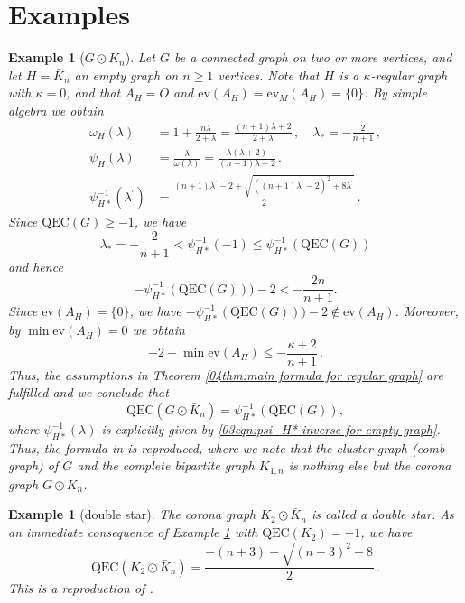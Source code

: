 \documentclass[12pt,a4paper]{article}
\newtheorem{example}[theorem]{Example}
\newcommand{\1}{{\bm 1}}
\numberwithin{equation}{section}
\begin{document}
\section{Examples}

\begin{example}[$G\odot \bar{K}_n$]
\label{05ex:H=empty graph}
\normalfont
Let $G$ be a connected graph on two or more vertices,
and let $H=\bar{K}_n$ an empty graph on $n\ge1$ vertices.
Note that $H$ is a $\kappa$-regular graph with $\kappa=0$,
and that $A_H=O$ and $\mathrm{ev}(A_H)=\mathrm{ev}_M(A_H)=\{0\}$.
By simple algebra we obtain
%
\begin{align}
\omega_H(\lambda)
&=1+\frac{n\lambda}{2+\lambda}
=\frac{(n+1)\lambda+2}{2+\lambda}\,,
\quad
\lambda_*=-\frac{2}{n+1}\,,
\nonumber \\[6pt]
\psi_H(\lambda)
&=\frac{\lambda}{\omega(\lambda)}
=\frac{\lambda(\lambda+2)}{(n+1)\lambda+2}\,.
\nonumber \\[6pt]
\psi_{H*}^{-1}(\lambda^\prime)
&=\frac{(n+1)\lambda^\prime-2
  +\sqrt{((n+1)\lambda^\prime-2)^2+8\lambda^\prime}}{2}\,.
\label{03eqn:psi_H* inverse for empty graph}
\end{align}
%
Since $\mathrm{QEC}(G)\ge-1$, we have
\[
\lambda_*=-\frac{2}{n+1}
<\psi_{H*}^{-1}(-1)\le \psi_{H*}^{-1}(\mathrm{QEC}(G))
\]
and hence
\[
-\psi_{H*}^{-1}(\mathrm{QEC}(G)))-2
<-\frac{2n}{n+1}.
\]
Since $\mathrm{ev}(A_H)=\{0\}$, we have
$-\psi_{H*}^{-1}(\mathrm{QEC}(G)))-2\notin\mathrm{ev}(A_H)$.
Moreover, by $\min\mathrm{ev}(A_H)=0$ we obtain
\[
-2-\min\mathrm{ev}(A_H)\le -\frac{\kappa+2}{n+1}\,.
\]
Thus, the assumptions 
in Theorem \ref{04thm:main formula for regular graph}
are fulfilled and we conclude that
\[
\mathrm{QEC}(G\odot \bar{K}_n)
=\psi_{H*}^{-1}(\mathrm{QEC}(G)),
\]
where $\psi_{H*}^{-1}(\lambda)$ is explicitly given by
\eqref{03eqn:psi_H* inverse for empty graph}.
Thus, the formula in \cite[Theorem 1.6]{Choudhury-Nandi2023}
is reproduced,
where we note that the cluster graph
(comb graph) of $G$ and the complete bipartite graph $K_{1,n}$
is nothing else but the corona graph $G\odot \bar{K}_n$.
\end{example}

\begin{example}[double star]
\label{05ex:H=double star}
\normalfont
The corona graph $K_2\odot \bar{K}_n$ is called a \textit{double star}.
As an immediate consequence of
Example \ref{05ex:H=empty graph} with $\mathrm{QEC}(K_2)=-1$,
we have
\[
\mathrm{QEC}(K_2\odot \bar{K}_n)
=\frac{-(n+3)+\sqrt{(n+3)^2-8}}{2}\,.
\]
This is a reproduction of \cite[Theorem 1.5]{Choudhury-Nandi2023}.
\end{example}
\end{document}
